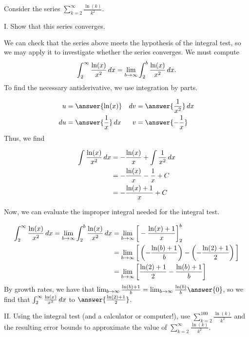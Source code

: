 \documentclass{ximera}
\begin{document}
\begin{example}
Consider the series $\sum_{k=2}^{\infty} \frac{\ln(k)}{k^2}$.  

I. Show that this series converges. 
\begin{explanation}
We can check that the series above meets the hypothesis of the integral test, so we may apply it to investigate whether the series converges.
We must compute 
\begin{align*}
\int_{2}^{\infty} \frac{\ln(x)}{x^2} \mathop{}\!d x &= \lim_{b \to \infty} \int_2^b  \frac{\ln(x)}{x^2} \mathop{}\!d x .\\
\end{align*}
To find the necessary antiderivative, we use integration by parts.

\begin{align*}
u&= \answer{\ln(x)} & \d v&= \answer{\frac{1}{x^2}} \d x \\
\d u &= \answer{\frac{1}{x}} \d x& v&= \answer{-\frac{1}{x}}
\end{align*}
Thus, we find

\begin{align*}
\int  \frac{\ln(x)}{x^2} \mathop{}\!d x &= -\frac{\ln(x)}{x} + \int \frac{1}{x^2} \mathop{}\!d x \\
&= -\frac{\ln(x)}{x} - \frac{1}{x} +C \\
&= -\frac{\ln(x)+1}{x}+C
\end{align*}

Now, we can evaluate the improper integral needed for the integral test.

\begin{align*}
\int_{2}^{\infty} \frac{\ln(x)}{x^2} \mathop{}\!d x = \lim_{b \to \infty} \int_2^b  \frac{\ln(x)}{x^2} \mathop{}\!d x &= \lim_{b \to \infty} \bigg[ -\frac{\ln(x)+1}{x} \bigg]_2^b\\
&= \lim_{b \to \infty} \bigg[ \left(-\frac{\ln(b)+1}{b}\right) - \left(-\frac{\ln(2)+1}{2}\right) \bigg]\\
&= \lim_{b \to \infty} \bigg[ \frac{\ln(2)+1}{2}-\frac{\ln(b)+1}{b} \bigg]
\end{align*}
By growth rates, we have that $\lim_{b \to \infty} \frac{\ln(b)+1}{b} = \lim_{b \to \infty} \frac{\ln(b)}{b} \answer{0}$, so we find that $\int_{2}^{\infty} \frac{\ln(x)}{x^2} \mathop{}\!d x$  to $\answer{\frac{\ln(2)+1}{2}}$.
 
\end{explanation}


II. Using the integral test (and a calculator or computer!), use $\sum_{k=2}^{100}  \frac{\ln(k)}{k^2}$ and the resulting error bounds to approximate the value of $\sum_{k=2}^{\infty}  \frac{\ln(k)}{k^2}$.


\end{example}
\end{document}
